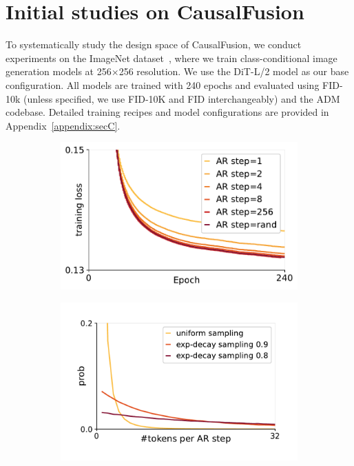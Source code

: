 \section{Initial studies on CausalFusion}\label{sec:init_exps}
To systematically study the design space of CausalFusion, we conduct experiments on the ImageNet dataset~\cite{deng2009imagenet}, where we train class-conditional image generation models at 256$\times$256 resolution. We use the DiT-L/2 model as our base configuration. All models are trained with 240 epochs and evaluated using FID-10k (unless specified, we use FID-10K and FID interchangeably) and the ADM~\cite{adm} codebase. 
Detailed training recipes and model configurations are provided in Appendix~\ref{appendix:secC}.

\begin{figure}[t]
  \centering
    \begin{subfigure}{0.32\textwidth}
        \centering
        \includegraphics[width=\linewidth]{figs/fig4a.pdf}
        \caption{}
        \label{fig:fig1}
    \end{subfigure}
    \hfill
    \begin{subfigure}{0.32\textwidth}
        \centering
        \includegraphics[width=\linewidth]{figs/fig4b-new.pdf}

\end{subfigure}
\end{figure}
